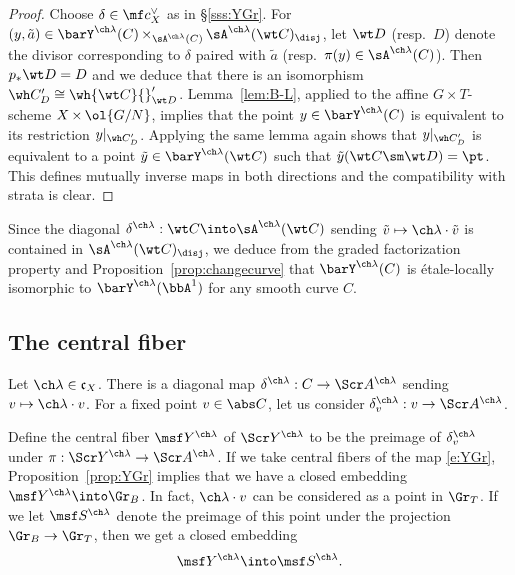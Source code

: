 \documentclass[final]{amsart}
\theoremstyle{remark}
\theoremstyle{definition}
\DeclareMathOperator*{\xt}{\times}
\numberwithin{equation}{section}
\begin{document}
\begin{proof}
Choose $\delta \in \mf c_X^\vee$ as in \S\ref{sss:YGr}. 
For $(y,\tilde a) \in \barY^{\ch\lambda}(C) \xt_{\sA^{\ch\lambda}(C)} \sA^{\ch\lambda}(\wt C)_\disj$, let $\wt D$ (resp.~$D$) denote the divisor corresponding to $\delta$ paired with 
$\tilde a$ (resp.~$\pi(y)\in \sA^{\ch\lambda}(C)$). 
Then $p_*\wt D = D$ and we deduce that there is an isomorphism 
$\wh C'_D \cong \wh{\wt C}{}'_{\wt D}$.
Lemma~\ref{lem:B-L}, applied to
the affine $G\xt T$-scheme $X \xt \ol{G/N}$, implies that the point 
$y\in \barY^{\ch\lambda}(C)$ is 
equivalent to its restriction $y|_{\wh C'_D}$. 
Applying the same lemma again shows that $y|_{\wh C'_D}$ is equivalent to 
a point $\tilde y \in \barY^{\ch\lambda}(\wt C)$ such that $\tilde y(\wt C \sm \wt D)=\pt$.
This defines mutually inverse maps in both directions and the compatibility 
with strata is clear.
\end{proof}

Since the diagonal $\delta^{\ch\lambda} : \wt C \into \sA^{\ch\lambda}(\wt C)$ 
sending $\tilde v \mapsto \ch\lambda\cdot \tilde v$ is contained in $\sA^{\ch\lambda}(\wt C)_\disj$, we deduce from the graded factorization property
and Proposition~\ref{prop:changecurve} that $\barY^{\ch\lambda}(C)$ 
is \'etale-locally isomorphic to $\barY^{\ch\lambda}(\bbA^1)$ for any smooth curve $C$.


\subsection{The central fiber} \label{def:centralfiber}
Let $\ch\lambda \in \mathfrak c_X$. There is a 
diagonal map $\delta^{\ch\lambda}:C \to \Scr A^{\ch\lambda}$
sending $v \mapsto \ch\lambda \cdot v$. For a fixed point
$v\in \abs C$, let us consider 
$\delta^{\ch\lambda}_v : v \to \Scr A^{\ch\lambda}$. 

\medskip

Define the central fiber $\msf Y^{\ch\lambda}$ of $\Scr Y^{\ch\lambda}$ 
to be the
preimage of $\delta^{\ch\lambda}_v$ under 
$\pi : \Scr Y^{\ch\lambda} \to \Scr A^{\ch\lambda}$. 
If we take central fibers of the map \eqref{e:YGr}, Proposition~\ref{prop:YGr} implies that we have a closed embedding 
$\msf Y^{\ch\lambda} \into \Gr_B$.
In fact, $\ch\lambda \cdot v$ can be considered as a point in 
$\Gr_T$. If we let $\msf S^{\ch\lambda}$ denote the preimage of this point
under the projection $\Gr_B \to \Gr_T$, then we get a closed embedding 
\begin{equation} \label{e:YembedGr}
    \msf Y^{\ch\lambda} \into \msf S^{\ch\lambda}.
\end{equation}
\end{document}
